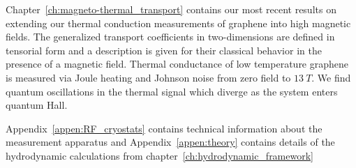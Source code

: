 Chapter~\ref{ch:magneto-thermal_transport} contains our most recent results on extending our thermal conduction measurements of graphene into high magnetic fields. The generalized transport coefficients in two-dimensions are defined in tensorial form and a description is given for their classical behavior in the presence of a magnetic field. Thermal conductance of low temperature graphene is measured via Joule heating and Johnson noise from zero field to $13~T$. We find quantum oscillations in the thermal signal which diverge as the system enters quantum Hall.

Appendix~\ref{appen:RF_cryostats} contains technical information about the measurement apparatus and Appendix~\ref{appen:theory} contains details of the hydrodynamic calculations from chapter~\ref{ch:hydrodynamic_framework}
